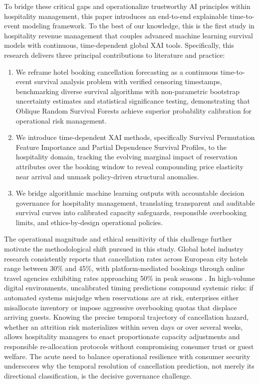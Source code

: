 \documentclass[pdflatex,iicol,sn-mathphys-ay]{sn-jnl}
\theoremstyle{thmstyleone}%
\theoremstyle{thmstyletwo}%
\theoremstyle{thmstylethree}%
\begin{document}
To bridge these critical gaps and operationalize trustworthy AI principles within hospitality management, this paper introduces an end-to-end explainable time-to-event modeling framework. To the best of our knowledge, this is the first study in hospitality revenue management that couples advanced machine learning survival models with continuous, time-dependent global XAI tools. Specifically, this research delivers three principal contributions to literature and practice:
\begin{enumerate}
\item We reframe hotel booking cancellation forecasting as a continuous time-to-event survival analysis problem with verified censoring timestamps, benchmarking diverse survival algorithms with non-parametric bootstrap uncertainty estimates and statistical significance testing, demonstrating that Oblique Random Survival Forests achieve superior probability calibration for operational risk management.
\item We introduce time-dependent XAI methods, specifically Survival Permutation Feature Importance and Partial Dependence Survival Profiles, to the hospitality domain, tracking the evolving marginal impact of reservation attributes over the booking window to reveal compounding price elasticity near arrival and unmask policy-driven structural anomalies.
\item We bridge algorithmic machine learning outputs with accountable decision governance for hospitality management, translating transparent and auditable survival curves into calibrated capacity safeguards, responsible overbooking limits, and ethics-by-design operational policies.
\end{enumerate}

The operational magnitude and ethical sensitivity of this challenge further motivate the methodological shift pursued in this study. Global hotel industry research consistently reports that cancellation rates across European city hotels range between 30\% and 45\%, with platform-mediated bookings through online travel agencies exhibiting rates approaching 50\% in peak seasons \citep{antonio2019big, falk2018modelling}. In high-volume digital environments, uncalibrated timing predictions compound systemic risks: if automated systems misjudge when reservations are at risk, enterprises either misallocate inventory or impose aggressive overbooking quotas that displace arriving guests. Knowing the precise temporal trajectory of cancellation hazard, whether an attrition risk materializes within seven days or over several weeks, allows hospitality managers to enact proportionate capacity adjustments and responsible re-allocation protocols without compromising consumer trust or guest welfare. The acute need to balance operational resilience with consumer security underscores why the temporal resolution of cancellation prediction, not merely its directional classification, is the decisive governance challenge.
\end{document}
